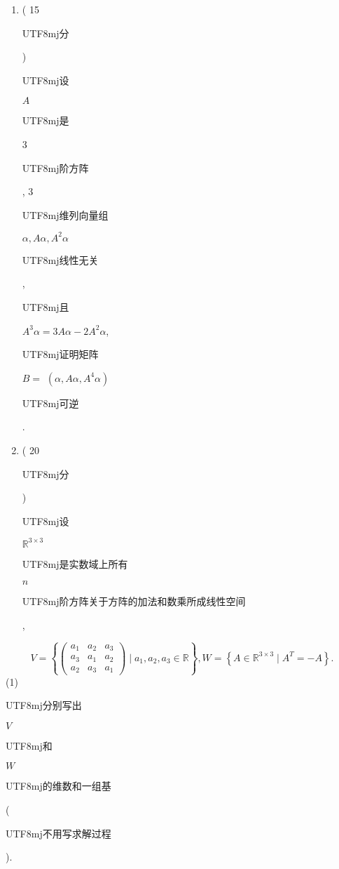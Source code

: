 \documentclass[10pt]{article}
\begin{document}
\begin{enumerate}
  \item ( 15 \begin{CJK}{UTF8}{mj}分\end{CJK}) \begin{CJK}{UTF8}{mj}设\end{CJK} $A$ \begin{CJK}{UTF8}{mj}是\end{CJK} 3 \begin{CJK}{UTF8}{mj}阶方阵\end{CJK}, 3 \begin{CJK}{UTF8}{mj}维列向量组\end{CJK} $\alpha, A \alpha, A^{2} \alpha$ \begin{CJK}{UTF8}{mj}线性无关\end{CJK}, \begin{CJK}{UTF8}{mj}且\end{CJK} $A^{3} \alpha=3 A \alpha-2 A^{2} \alpha$, \begin{CJK}{UTF8}{mj}证明矩阵\end{CJK} $B=$ $\left(\alpha, A \alpha, A^{4} \alpha\right)$ \begin{CJK}{UTF8}{mj}可逆\end{CJK}.

  \item ( 20 \begin{CJK}{UTF8}{mj}分\end{CJK}) \begin{CJK}{UTF8}{mj}设\end{CJK} $\mathbb{R}^{3 \times 3}$ \begin{CJK}{UTF8}{mj}是实数域上所有\end{CJK} $n$ \begin{CJK}{UTF8}{mj}阶方阵关于方阵的加法和数乘所成线性空间\end{CJK},

\end{enumerate}
$$
V=\left\{\left(\begin{array}{lll}
a_{1} & a_{2} & a_{3} \\
a_{3} & a_{1} & a_{2} \\
a_{2} & a_{3} & a_{1}
\end{array}\right) \mid a_{1}, a_{2}, a_{3} \in \mathbb{R}\right\}, W=\left\{A \in \mathbb{R}^{3 \times 3} \mid A^{T}=-A\right\} .
$$
(1) \begin{CJK}{UTF8}{mj}分别写出\end{CJK} $V$ \begin{CJK}{UTF8}{mj}和\end{CJK} $W$ \begin{CJK}{UTF8}{mj}的维数和一组基\end{CJK} (\begin{CJK}{UTF8}{mj}不用写求解过程\end{CJK}).
\end{document}
